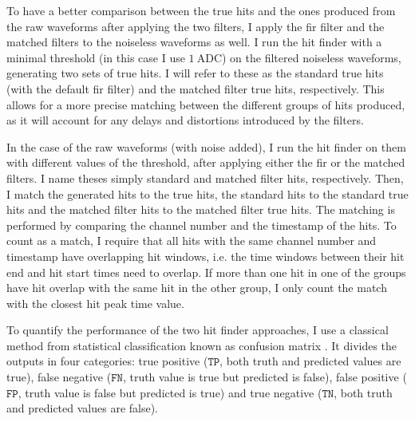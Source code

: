 To have a better comparison between the true hits and the ones produced from the raw waveforms after applying the two filters, I apply the \gls{fir} filter and the matched filters to the noiseless waveforms as well. I run the hit finder with a minimal threshold (in this case I use $1 \ \mathrm{ADC}$) on the filtered noiseless waveforms, generating two sets of true hits. I will refer to these as the standard true hits (with the default \gls{fir} filter) and the matched filter true hits, respectively. This allows for a more precise matching between the different groups of hits produced, as it will account for any delays and distortions introduced by the filters.

In the case of the raw waveforms (with noise added), I run the hit finder on them with different values of the threshold, after applying either the \gls{fir} or the matched filters. I name theses simply standard and matched filter hits, respectively. Then, I match the generated hits to the true hits, the standard hits to the standard true hits and the matched filter hits to the matched filter true hits. The matching is performed by comparing the channel number and the timestamp of the hits. To count as a match, I require that all hits with the same channel number and timestamp have overlapping hit windows, i.e. the time windows between their hit end and hit start times need to overlap. If more than one hit in one of the groups have hit overlap with the same hit in the other group, I only count the match with the closest hit peak time value.

To quantify the performance of the two hit finder approaches, I use a classical method from statistical classification known as confusion matrix \cite{Stehman1997}. It divides the outputs in four categories: true positive ($\mathtt{TP}$, both truth and predicted values are true), false negative ($\mathtt{FN}$, truth value is true but predicted is false), false positive ($\mathtt{FP}$, truth value is false but predicted is true) and true negative ($\mathtt{TN}$, both truth and predicted values are false).

